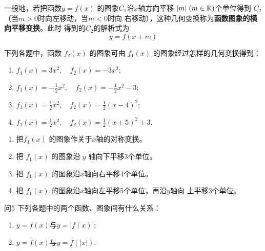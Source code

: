 一般地，若把函数$y=f(x)$
的图象$C_1$沿$x$轴方向平移
$|m|\; (m\in\mathbb{R})$个单位得到
$C_2$（当$m>0$时向左移动，当$m<0$时向
右移动），这种几何变换称为\textbf{函数图象的横向平移变换}。此时
得到的$C_2$的解析式为
\[y=f(x+m)\]

\begin{example}
    下列各题中，函数
$f_2(x)$
的图象可由
$f_1(x)$
的图象经过怎样的几何变换得到：
\begin{enumerate}[(1)]
    \item $f_1(x)=3x^2,\quad f_2(x)=-3x^2$;
    \item $f_1(x)=-\frac{1}{2}x^2,\quad f_2(x)=-\frac{1}{2}x^2-3$;
    \item $f_1(x)=\frac{1}{2}x^2,\quad f_2(x)=\frac{1}{2}(x-4)^2$;
    \item $f_1(x)=\frac{1}{2}x^2,\quad f_2(x)=\frac{1}{2}(x+5)^2+3$.
\end{enumerate}
\end{example}

\begin{solution}
\begin{enumerate}[(1)]
    \item 把$f_1(x)$
    的图象作关于$x$轴的对称变换。
    \item 把    $f_1(x)$
    的图象沿
    $y$
    轴向下平移3个单位。
    \item 把    $f_1(x)$
    的图象沿$x$轴向右平移4个单位。
    \item 把    $f_1(x)$
    的图象沿$x$轴向左平移5个单位，再沿$y$轴向
    上平移3个单位。
\end{enumerate}
\end{solution}

\begin{thm}{问5}
    下列各题中的两个函数、图象间有什么关系：
\begin{enumerate}[(1)]
    \item $y=f(x)$与$y=|f(x)|$;
    \item  $y=f(x)$与$y=f(|x|)$.
\end{enumerate}
\end{thm}

